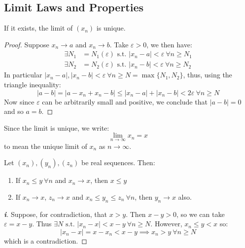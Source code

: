 \documentclass[../main.tex]{subfiles}
\begin{document}
\subsection{Limit Laws and Properties}
\begin{lemma}
  If it exists, the limit of $(x_n)$ is unique.
\end{lemma}
\begin{proof}
  Suppose $x_n \to a$ and $x_n \to b$.
  Take $\varepsilon > 0$, we then have:
  \begin{align*}
    \exists N_1 &= N_1(\varepsilon) \text{ s.t. } |x_n - a| < \varepsilon\ \forall n \geq N_1 \\
    \exists N_2 &= N_2(\varepsilon) \text{ s.t. } |x_n - b| < \varepsilon\ \forall n \geq N_2
  \end{align*}
  In particular $|x_n - a|, |x_n - b| < \varepsilon\ \forall n \geq N = \max\{N_1, N_2\}$, thus, using the triangle inequality:
  \[
    |a - b| = |a - x_n + x_n - b| \leq |x_n - a| + |x_n - b| < 2\varepsilon\ \forall n \geq N
  \]
  Now since $\varepsilon$ can be arbitrarily small and positive, we conclude that $|a - b| = 0$ and so $a = b$.
\end{proof}
\begin{remark}[Notation]
  Since the limit is unique, we write:
  \[
    \lim_{n \to \infty} x_n = x
  \]
  to mean the unique limit of $x_n$ as $n \to \infty$.
\end{remark}
\begin{proposition}
  Let $(x_n), (y_n), (z_n)$ be real sequences.
  \label{sandwichThm}
  Then:
  \begin{enumerate}
    \item If $x_n \leq y\ \forall n$ and $x_n \to x$, then $x \leq y$
    \item If $x_n \to x$, $z_n \to x$ and $x_n \leq y_n \leq z_n\ \forall n$, then $y_n \to x$ also.
  \end{enumerate}
\end{proposition}
\begin{proof}[\textbf{i}]
  Suppose, for contradiction, that $x > y$.
  Then $x - y > 0$, so we can take $\varepsilon = x - y$.
  Thus $\exists N \text{ s.t. } |x_n - x| < x - y \ \forall n \geq N$.
  However, $x_n \leq y < x$ so:
  \[
    |x_n - x| = x - x_n < x - y \implies x_n > y\ \forall n \geq N
  \]
  which is a contradiction.
\end{proof}
\end{document}
